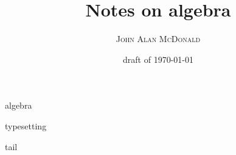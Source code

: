 \documentclass[11pt,openany]{book}
\title{Notes on algebra}
\author{\textsc{John Alan McDonald}}
\date{draft of \today}
\def \texFolder {../../tex/}
\def \sharedFolder {../../shared/}
\begin{document}
\maketitle

\frontmatter

\begingroup
\let\onecolumn\twocolumn
\sffamily
\tableofcontents
\rmfamily
\endgroup

\mainmatter

{algebra}

\appendix
{typesetting}
\backmatter


{tail}
\end{document}
